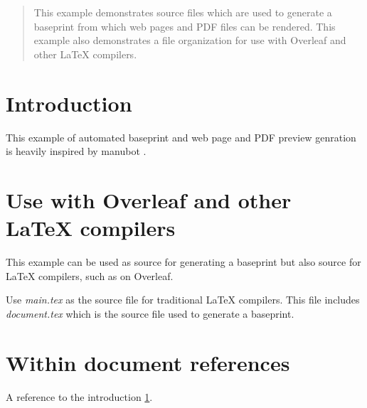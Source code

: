 



\begin{abstract}
This example demonstrates source files which are used to generate a baseprint from which
web pages and PDF files can be rendered.
This example also demonstrates a file organization for use with Overleaf and other LaTeX
compilers.
\end{abstract}

\section{Introduction}

\label{intro}

This example of automated baseprint and web page and PDF preview genration is heavily
inspired by manubot \cite{himmelstein_open_2019}.

\section{Use with Overleaf and other LaTeX compilers}

This example can be used as source for generating a baseprint but also source for
LaTeX compilers, such as on Overleaf.

Use {\it main.tex} as the source file for traditional LaTeX compilers.
This file includes {\it document.tex} which is the source file used to generate a
baseprint.

\section{Within document references}

A reference to the introduction \ref{intro}.


\printbibliography %

